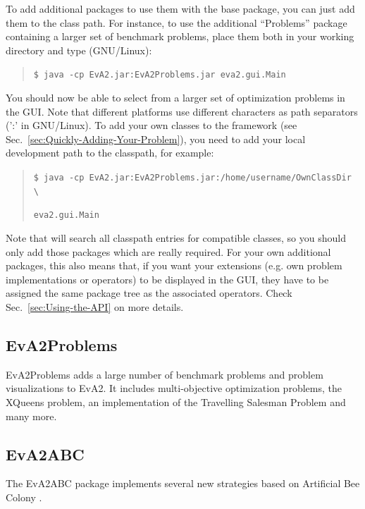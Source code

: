 To add additional packages to use them with the  base package,
you can just add them to the class path. For instance, to use the
additional ``Problems'' package containing a larger set of benchmark
problems, place them both in your working directory and type (GNU/Linux):
\begin{quotation}
\texttt{\small \$ java -cp EvA2.jar:EvA2Problems.jar eva2.gui.Main}{\small \par}
\end{quotation}
You should now be able to select from a larger set of optimization
problems in the GUI. Note that different platforms use different characters
as path separators (':' in GNU/Linux). To add your own classes to
the  framework (see Sec.~\ref{sec:Quickly-Adding-Your-Problem}),
you need to add your local development path to the classpath, for
example:
\begin{quotation}
\texttt{\small \$ java -cp EvA2.jar:EvA2Problems.jar:/home/username/OwnClassDir
\textbackslash{}}{\small \par}

\texttt{\small eva2.gui.Main}{\small \par}
\end{quotation}
Note that  will search all classpath entries for compatible
classes, so you should only add those packages which are really required.
For your own additional packages, this also means that, if you want
your extensions (e.g. own problem implementations or operators) to
be displayed in the  GUI, they have to be assigned the
same package tree as the associated  operators. Check Sec.~\ref{sec:Using-the-API}
on more details.

\subsection{EvA2Problems}

EvA2Problems adds a large number of benchmark problems and problem visualizations to EvA2. It includes multi-objective optimization problems, the XQueens problem, an implementation of the Travelling Salesman Problem and many more. 

\subsection{EvA2ABC}

The EvA2ABC package implements several new strategies based on Artificial Bee Colony \cite{Karaboga2007}. 
